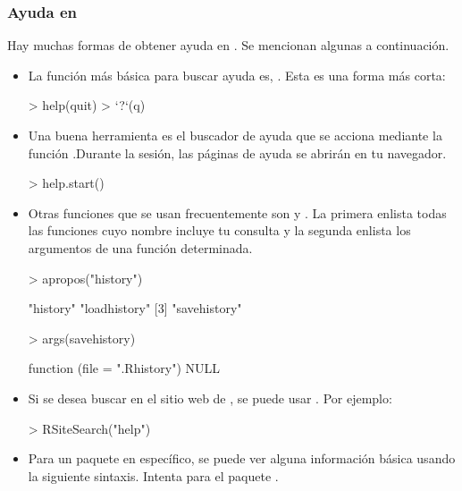\begin{frame}
  \frametitle{Ayuda en }
  Hay muchas formas de obtener ayuda en . Se mencionan algunas a continuaci\'on.
  \begin{itemize}
  \item La funci\'on m\'as b\'asica para buscar ayuda es, . Esta es una forma m\'as corta: 
\begin{Schunk}
\begin{Sinput}
> help(quit)
> `?`(q)
\end{Sinput}
\end{Schunk}
  \item Una buena herramienta es el buscador de ayuda que se acciona mediante la funci\'on .Durante la sesi\'on, las p\'aginas de ayuda se abrir\'an en tu navegador.
\begin{Schunk}
\begin{Sinput}
> help.start()
\end{Sinput}
\end{Schunk}
  \item Otras funciones que se usan frecuentemente son  y . La primera enlista todas las funciones cuyo nombre incluye tu consulta y la segunda enlista los argumentos de una funci\'on determinada.
\begin{Schunk}
\begin{Sinput}
> apropos("history")
\end{Sinput}
\begin{Soutput}
[1] "history"     "loadhistory"
[3] "savehistory"
\end{Soutput}
\begin{Sinput}
> args(savehistory)
\end{Sinput}
\begin{Soutput}
function (file = ".Rhistory") 
NULL
\end{Soutput}
\end{Schunk}
  \item Si se desea buscar en el sitio web de , se puede usar . Por ejemplo:
\begin{Schunk}
\begin{Sinput}
> RSiteSearch("help")
\end{Sinput}
\end{Schunk}
  \item Para un paquete en espec\'ifico, se puede ver alguna informaci\'on b\'asica usando la siguiente sintaxis. Intenta para el paquete .

\end{itemize}
\end{frame}
